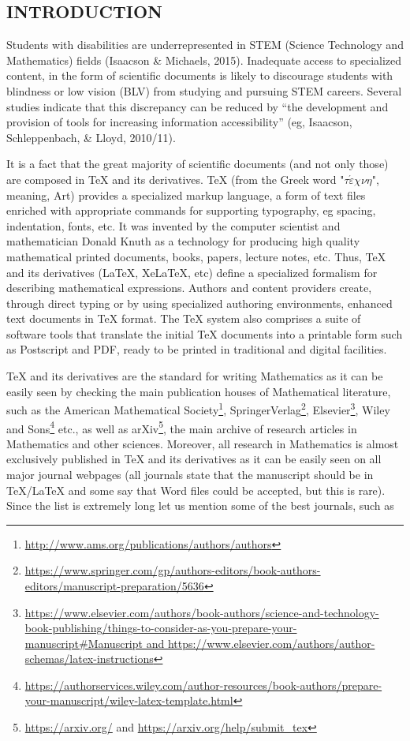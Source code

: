 \documentclass[11.5pt]{sig-alternate} %
\begin{document}
\begin{large}
\section*{INTRODUCTION}

Students with disabilities are underrepresented in STEM (Science Technology and Mathematics) fields (Isaacson \& Michaels, 2015). Inadequate access to specialized content, in the form of scientific documents is likely to discourage students with blindness or low vision (BLV) from studying and pursuing STEM careers.  Several studies indicate that this discrepancy can be reduced by “the development and provision of tools for increasing information accessibility” (eg, Isaacson, Schleppenbach, \& Lloyd, 2010/11).  

It is a fact that the great majority of scientific documents (and not only those) are composed in TeX and its derivatives. TeX (from the Greek word "$\tau \acute{\varepsilon} \chi \nu \eta$", meaning, Art) provides a specialized markup language, a form of text files enriched with appropriate commands for supporting typography, eg spacing, indentation, fonts, etc. It was invented by the computer scientist and mathematician Donald Knuth as a technology for producing high quality mathematical printed documents, books, papers, lecture notes, etc. Thus, TeX and its derivatives (LaTeX, XeLaTeX, etc) define a specialized formalism for describing mathematical expressions. Authors and content providers create, through direct typing or by using specialized authoring environments, enhanced text documents in TeX format. The TeX system also comprises a suite of software tools that translate the initial TeX documents into a printable form such as Post\-script and PDF, ready to be printed in traditional and digital facilities.
 
TeX and its derivatives are the standard for writing Mathematics as it can be easily seen by checking the main publication houses of Mathematical literature, such as the American Mathematical Society\footnote{\url{http://www.ams.org/publications/authors/authors}},  SpringerVerlag\footnote{\url{https://www.springer.com/gp/authors-editors/book-authors-editors/manuscript-preparation/5636}},  Elsevier\footnote{\url{https://www.elsevier.com/authors/book-authors/science-and-technology-book-publishing/things-to-consider-as-you-prepare-your-manuscript\#Manuscript and https://www.elsevier.com/authors/author-schemas/latex-instructions}},  Wiley and Sons\footnote{\url{https://authorservices.wiley.com/author-resources/book-authors/prepare-your-manuscript/wiley-latex-template.html}}  etc., as well as arXiv\footnote{\url{https://arxiv.org/} and \url{https://arxiv.org/help/submit_tex}},  the main archive of research articles in Mathematics and other sciences.  Moreover, all research in Mathematics is almost exclusively published in TeX and its derivatives as it can be easily seen on all major journal webpages (all journals state that the manuscript should be in TeX/LaTeX and some say that Word files could be accepted, but this is rare). Since the list is extremely long let us mention some of the best journals, such as 


\end{large}
\end{document}

